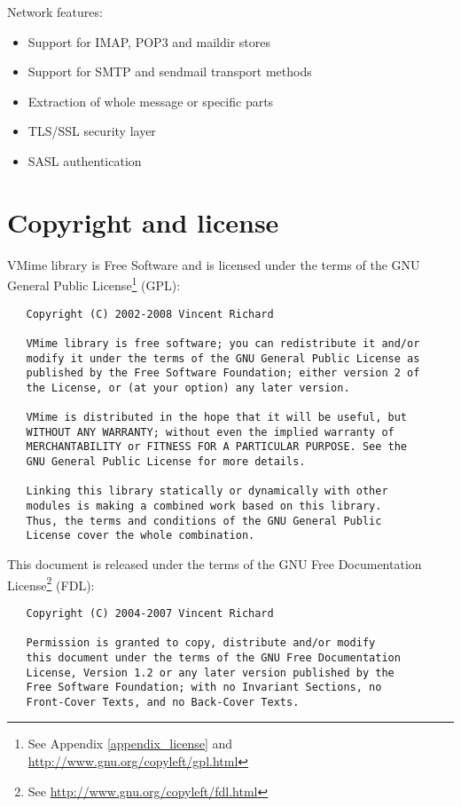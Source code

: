 \noindent Network features:

\begin{itemize}
\item Support for IMAP, POP3 and maildir stores
\item Support for SMTP and sendmail transport methods
\item Extraction of whole message or specific parts
\item TLS/SSL security layer
\item SASL authentication
\end{itemize}


\section{Copyright and license}

VMime library is Free Software and is licensed under the terms of the GNU
General Public License\footnote{See Appendix \ref{appendix_license} and
\url{http://www.gnu.org/copyleft/gpl.html}} (GPL):

\begin{verbatim}
   Copyright (C) 2002-2008 Vincent Richard

   VMime library is free software; you can redistribute it and/or
   modify it under the terms of the GNU General Public License as
   published by the Free Software Foundation; either version 2 of
   the License, or (at your option) any later version.

   VMime is distributed in the hope that it will be useful, but
   WITHOUT ANY WARRANTY; without even the implied warranty of
   MERCHANTABILITY or FITNESS FOR A PARTICULAR PURPOSE. See the
   GNU General Public License for more details.

   Linking this library statically or dynamically with other
   modules is making a combined work based on this library.
   Thus, the terms and conditions of the GNU General Public
   License cover the whole combination.
\end{verbatim}

\newpage
\noindent This document is released under the terms of the
GNU Free Documentation
License\footnote{See \url{http://www.gnu.org/copyleft/fdl.html}} (FDL):

\begin{verbatim}
   Copyright (C) 2004-2007 Vincent Richard

   Permission is granted to copy, distribute and/or modify
   this document under the terms of the GNU Free Documentation
   License, Version 1.2 or any later version published by the
   Free Software Foundation; with no Invariant Sections, no
   Front-Cover Texts, and no Back-Cover Texts.
\end{verbatim}

